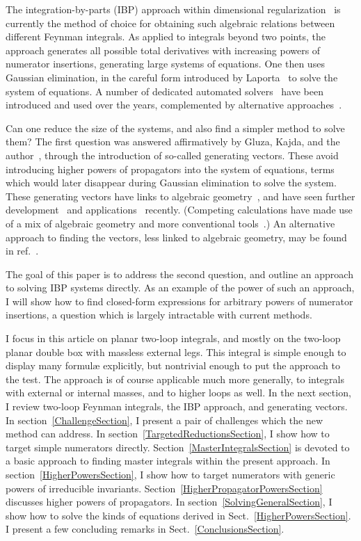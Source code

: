 \documentclass[aps,prd,preprint,groupedaddress,nofootinbib,showpacs,eqsecnum]{revtex4}
\def\sect#1{Sect.~{\ref{#1}}}
\begin{document}
The integration-by-parts (IBP) approach within
dimensional regularization~\cite{IBP} is currently the method of choice
for obtaining such algebraic relations between different Feynman integrals.
As applied to integrals beyond two points, the approach generates
all possible total derivatives with increasing powers of numerator insertions,
generating large systems of equations.
One then uses Gaussian elimination, in the careful form introduced
by Laporta~\cite{Laporta} to solve the system of equations.  A
number of dedicated automated solvers~\cite{AutomatedSolvers}
have been introduced and used over the years,
complemented by alternative approaches~\cite{AlternativeSolvers}.

Can one reduce the size of the systems, and also find a simpler method
to solve them?  The first question was answered affirmatively
by Gluza, Kajda, and the author~\cite{IBPGeneratingVectors},
through the introduction of so-called generating vectors.  These avoid
introducing higher powers of propagators into the system of equations,
terms which would later disappear during Gaussian elimination to solve
the system. These generating vectors have links to algebraic 
geometry~\cite{Ita,LarsenZhang}, and have seen 
further development~\cite{FurtherDevelopment}
and applications~\cite{FreiburgNumerical,HigherLoopIBP} recently.
(Competing calculations have made use of a mix of algebraic
geometry and more conventional tools~\cite{BadgerTwoLoop}.)
An alternative approach to finding the vectors, less linked
to algebraic geometry, may be found in ref.~\cite{Schabinger}.

The goal of this paper is to address the second question,
and outline an approach to solving IBP systems directly.  As an
example of the power of such an approach, I will show how to find
closed-form expressions for arbitrary powers of numerator insertions,
a question which is largely intractable with current methods.

I focus in this article on planar two-loop integrals, and mostly
on the two-loop planar double box with massless external
legs.  This integral is simple enough to display many formul\ae{} explicitly,
but nontrivial enough to put the approach to the test.  The approach
is of course applicable much more generally, to integrals with external
or internal masses, and to higher loops as well.
In the next section, I review two-loop Feynman integrals, the IBP
approach, and generating vectors.  In section~\ref{ChallengeSection},
I present a pair of challenges which the new method can address.
In section~\ref{TargetedReductionsSection}, I show how to target
simple numerators directly.  Section~\ref{MasterIntegralsSection}
is devoted to a basic approach to finding master integrals within
the present approach.  In section~\ref{HigherPowersSection}, I 
show how to target numerators with generic powers of irreducible
invariants.  Section~\ref{HigherPropagatorPowersSection} discusses
higher powers of propagators.  In section~\ref{SolvingGeneralSection},
I show how to solve the kinds of equations derived in \sect{HigherPowersSection}.
I present a few concluding remarks in \sect{ConclusionsSection}.
\end{document}

